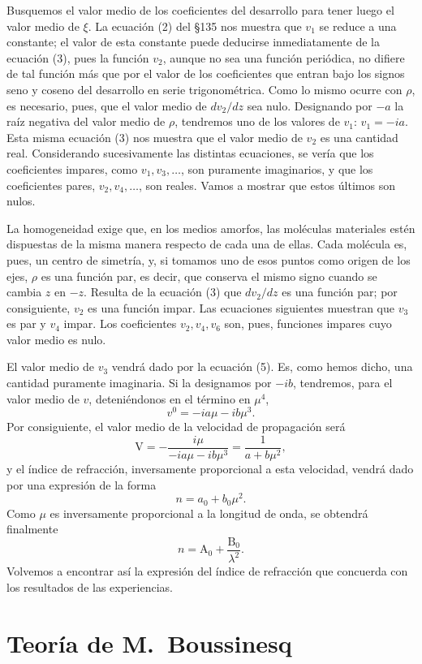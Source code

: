 Busquemos el valor medio de los coeficientes del desarrollo para tener
luego el valor medio de $\xi$. La ecuación (2) del §135 nos muestra que
$v_1$ se reduce a una constante; el valor de esta constante puede
deducirse inmediatamente de la ecuación (3), pues la función $v_2$, aunque
no sea una función periódica, no difiere de tal función más que por el
valor de los coeficientes que entran bajo los signos seno y coseno del
desarrollo en serie trigonométrica. Como lo mismo ocurre con $\rho$, es
necesario, pues, que el valor medio de $dv_2/dz$ sea nulo. Designando por
$-a$ la raíz negativa del valor medio de $\rho$, tendremos uno de los
valores de $v_1$: $v_1=-ia$. Esta misma ecuación (3) nos muestra que el
valor medio de $v_2$ es una cantidad real. Considerando sucesivamente las
distintas ecuaciones, se vería que los coeficientes impares, como
$v_1,v_3,\ldots$, son puramente imaginarios, y que los coeficientes pares,
$v_2,v_4,\ldots$, son reales. Vamos a mostrar que estos últimos son nulos.

La homogeneidad exige que, en los medios amorfos, las moléculas materiales
estén dispuestas de la misma manera respecto de cada una de ellas. Cada
molécula es, pues, un centro de simetría, y, si tomamos uno de esos puntos
como origen de los ejes, $\rho$ es una función par, es decir, que conserva
el mismo signo cuando se cambia $z$ en $-z$. Resulta de la ecuación (3)
que $dv_2/dz$ es una función par; por consiguiente, $v_2$ es una función
impar. Las ecuaciones siguientes muestran que $v_3$ es par y $v_4$ impar.
Los coeficientes $v_2,v_4,v_6$ son, pues, funciones impares cuyo valor
medio es nulo.

El valor medio de $v_3$ vendrá dado por la ecuación (5). Es, como hemos
dicho, una cantidad puramente imaginaria. Si la designamos por $-ib$,
tendremos, para el valor medio de $v$, deteniéndonos en el término en
$\mu^4$,
\[
v^0=-ia\mu-ib\mu^3.
\]
Por consiguiente, el valor medio de la velocidad de propagación será
\[
\mathrm V=-\frac{i\mu}{-ia\mu-ib\mu^3}=\frac{1}{a+b\mu^2},
\]
y el índice de refracción, inversamente proporcional a esta velocidad,
vendrá dado por una expresión de la forma
\[
n=a_0+b_0\mu^2.
\]
Como $\mu$ es inversamente proporcional a la longitud de onda, se obtendrá
finalmente
\[
n=\mathrm A_0+\frac{\mathrm B_0}{\lambda^2}.
\]
Volvemos a encontrar así la expresión del índice de refracción que
concuerda con los resultados de las experiencias.

\section{Teoría de M.~Boussinesq}


